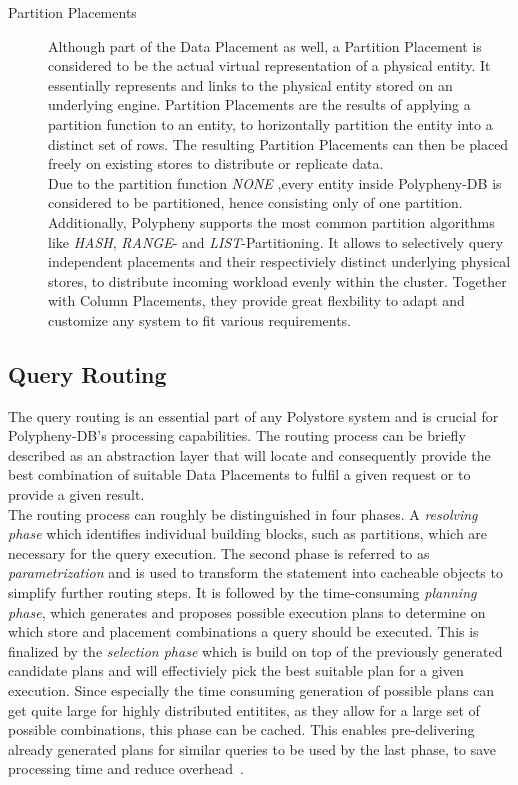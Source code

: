 \begin{description}
   

    \item [Partition Placements] Although part of the Data Placement as well, a Partition Placement is considered to be the actual virtual representation of a physical entity.
    It essentially represents and links to the physical entity stored on an underlying engine. Partition Placements are the results of applying a partition function to an entity,
    to horizontally partition the entity into a distinct set of rows. The resulting Partition Placements can then be placed freely on existing stores to distribute or replicate data.\\
    Due to the partition function \emph{NONE} ,every entity inside Polypheny-DB is considered to be partitioned, hence consisting only of one partition.
    Additionally, Polypheny supports the most common partition algorithms like \emph{HASH}, \emph{RANGE}- and \emph{LIST}-Partitioning. 
    It allows to selectively query independent placements and their respectiviely distinct underlying physical stores, to distribute incoming workload evenly within the cluster.
    Together with Column Placements, they provide great flexbility to adapt and customize any system to fit various requirements.
    
\end{description}





\subsection{Query Routing}
\label{sec:routing}

The query routing is an essential part of any Polystore system and is crucial for Polypheny-DB's processing capabilities.
The routing process can be briefly described as an abstraction layer that will locate and consequently provide the best combination of suitable Data Placements to fulfil a given request 
or to provide a given result. \\
The routing process can roughly be distinguished in four phases. A \emph{resolving phase} which identifies individual building blocks, such as partitions, which are necessary 
for the query execution. The second phase is referred to as \emph{parametrization} and is used to transform the statement into cacheable objects to simplify further routing steps.
It is followed by the time-consuming \emph{planning phase}, which generates and proposes possible execution plans to determine on which store and placement combinations a query should be executed.
This is finalized by the \emph{selection phase} which is build on top of the previously generated candidate plans and will effectiviely pick the best suitable plan for a 
given execution. Since especially the time consuming generation of possible plans can get quite large for highly distributed entitites, as they allow for a large set of 
possible combinations, this phase can be cached.
This enables pre-delivering already generated plans for similar queries to be used by the last phase, to save processing time and reduce overhead~\cite{vogt_dis_2022}.

